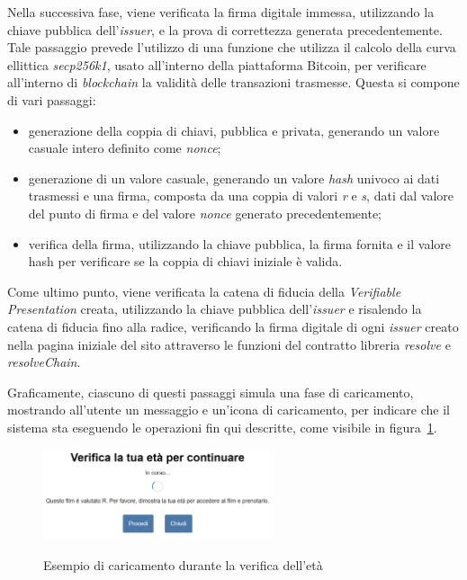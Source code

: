 Nella successiva fase, viene verificata la firma digitale immessa, utilizzando la chiave pubblica dell'\textit{issuer}, e la prova di correttezza generata precedentemente.
Tale passaggio prevede l'utilizzo di una funzione che utilizza il calcolo della curva ellittica \textit{secp256k1}, usato all'interno della piattaforma Bitcoin, per verificare all'interno di \textit{blockchain}
la validità delle transazioni trasmesse. Questa si compone di vari passaggi:
\begin{itemize}
    \item generazione della coppia di chiavi, pubblica e privata, generando un valore casuale intero definito come \textit{nonce};
    \item generazione di un valore casuale, generando un valore \textit{hash} univoco ai dati trasmessi e una firma, composta da una coppia di valori \textit{r} e \textit{s}, 
    dati dal valore del punto di firma e del valore \textit{nonce} generato precedentemente;
    \item verifica della firma, utilizzando la chiave pubblica, la firma fornita e il valore hash per verificare se la coppia di chiavi iniziale è valida.
\end{itemize}

Come ultimo punto, viene verificata la catena di fiducia della \textit{Verifiable Presentation} creata, utilizzando la chiave pubblica dell'\textit{issuer} e risalendo
la catena di fiducia fino alla radice, verificando la firma digitale di ogni \textit{issuer} creato nella pagina iniziale del sito attraverso le funzioni del contratto libreria
\textit{resolve} e \textit{resolveChain}.

Graficamente, ciascuno di questi passaggi simula una fase di caricamento, mostrando all'utente un messaggio e un'icona di caricamento, per indicare che il sistema sta eseguendo
le operazioni fin qui descritte, come visibile in figura~\ref{fig:verifica-eta-corso}.

\begin{figure}[ht]
    \centering
    \includegraphics[width=0.6\textwidth, alt={Finestra visualizzata di caricamento durante la verifica dell'età}]{immagini/frontend/verification-doing.png}
    \caption{Esempio di caricamento durante la verifica dell'età}\label{fig:verifica-eta-corso}
\end{figure}

